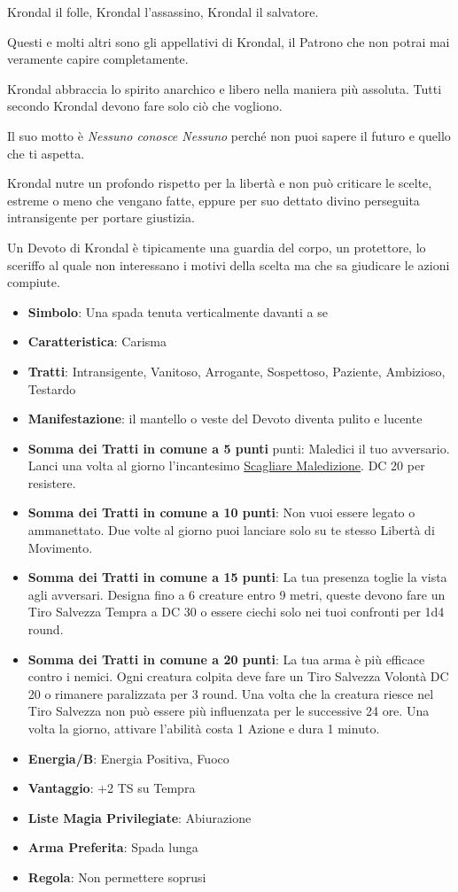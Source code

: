 \begin{multicols}{2}
Krondal il folle, Krondal l'assassino, Krondal il salvatore.

Questi e molti altri sono gli appellativi di Krondal, il Patrono che non potrai mai veramente capire completamente.

Krondal abbraccia lo spirito anarchico e libero nella maniera più assoluta. Tutti secondo Krondal devono fare solo ciò che vogliono.

Il suo motto è \emph{Nessuno conosce Nessuno} perché non puoi sapere il futuro e quello che ti aspetta.

Krondal nutre un profondo rispetto per la libertà e non può criticare le scelte, estreme o meno che vengano fatte, eppure per suo dettato divino perseguita intransigente per portare giustizia.

Un Devoto di Krondal è tipicamente una guardia del corpo, un protettore, lo sceriffo al quale non interessano i motivi della scelta ma che sa giudicare le azioni compiute.

\begin{itemize}[leftmargin=*] \setlength{\itemsep}{0pt}
\item \textbf{Simbolo}: Una spada tenuta verticalmente davanti a se
\item \textbf{Caratteristica}: Carisma
\item \textbf{Tratti}: Intransigente, Vanitoso, Arrogante, Sospettoso, Paziente, Ambizioso, Testardo
\item \textbf{Manifestazione}: il mantello o veste del Devoto diventa pulito e lucente
\item \textbf{Somma dei Tratti in comune a 5 punti} punti: Maledici il tuo avversario. Lanci una volta al giorno l'incantesimo \hyperlink{Scagliare Maledizione}{Scagliare Maledizione}. DC 20 per resistere.
\item \textbf{Somma dei Tratti in comune a 10 punti}: Non vuoi essere legato o ammanettato. Due volte al giorno puoi lanciare solo su te stesso Libertà di Movimento.
\item \textbf{Somma dei Tratti in comune a 15 punti}: La tua presenza toglie la vista agli avversari. Designa fino a 6 creature entro 9 metri, queste devono fare un Tiro Salvezza Tempra a DC 30 o essere ciechi solo nei tuoi confronti per 1d4 round.
\item \textbf{Somma dei Tratti in comune a 20 punti}: La tua arma è più efficace contro i nemici. Ogni creatura colpita deve fare un Tiro Salvezza Volontà DC 20 o rimanere paralizzata per 3 round. Una volta che la creatura riesce nel Tiro Salvezza non può essere più influenzata per le successive 24 ore. Una volta la giorno, attivare l'abilità costa 1 Azione e dura 1 minuto.
\item \textbf{Energia/B}: Energia Positiva, Fuoco
\item \textbf{Vantaggio}: +2 TS su Tempra
\item \textbf{Liste Magia Privilegiate}: Abiurazione
\item \textbf{Arma Preferita}: Spada lunga
\item \textbf{Regola}: Non permettere soprusi
\end{itemize}


\end{multicols}
